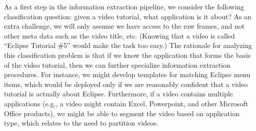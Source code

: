 \documentclass[10pt]{article}
\begin{document}
As a first step in the information extraction pipeline, we consider the following classification
question: given a video tutorial, what application is it about? As an extra challenge, we will only
assume we have access to the raw frames, and not other meta data such as the video title, etc.
(Knowing that a video is called ``Eclipse Tutorial \#5'' would make the task too easy.) The
rationale for analyzing this classification problem is that if we know the application that forms
the basis of the video tutorial, then we can further specialize information extraction procedures.
For instance, we might develop templates for matching Eclipse menu items, which would be deployed
only if we are reasonably confident that a video tutorial is actually about Eclipse. Furthermore, if
a video contains multiple applications (e.g., a video might contain Excel, Powerpoint, and other
Microsoft Office products), we might be able to segment the video based on application type, which
relates to the need to partition videos.
\end{document}

